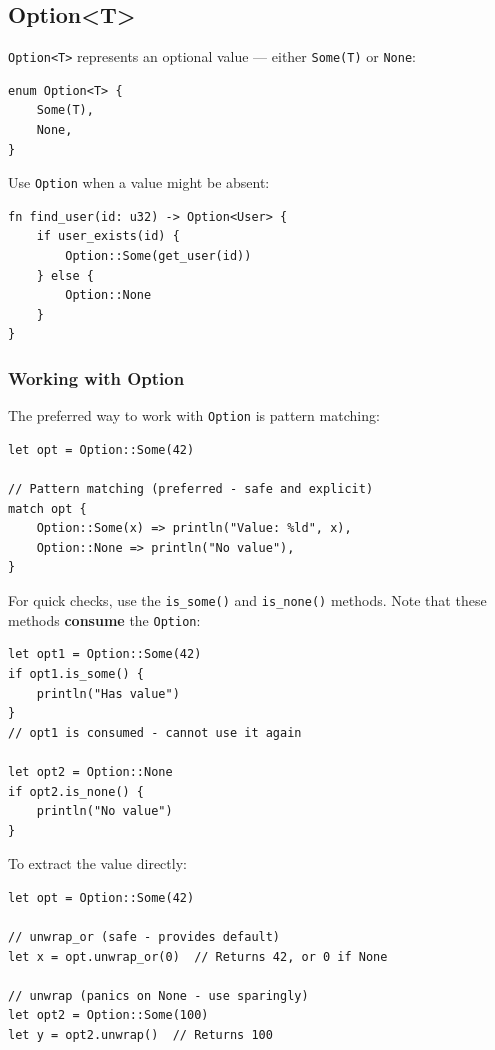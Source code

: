 \subsection{Option<T>}

\texttt{Option<T>} represents an optional value --- either \texttt{Some(T)} or \texttt{None}:

\begin{lstlisting}
enum Option<T> {
    Some(T),
    None,
}
\end{lstlisting}

Use \texttt{Option} when a value might be absent:

\begin{lstlisting}
fn find_user(id: u32) -> Option<User> {
    if user_exists(id) {
        Option::Some(get_user(id))
    } else {
        Option::None
    }
}
\end{lstlisting}

\subsubsection{Working with Option}

The preferred way to work with \texttt{Option} is pattern matching:

\begin{lstlisting}
let opt = Option::Some(42)

// Pattern matching (preferred - safe and explicit)
match opt {
    Option::Some(x) => println("Value: %ld", x),
    Option::None => println("No value"),
}
\end{lstlisting}

For quick checks, use the \texttt{is\_some()} and \texttt{is\_none()} methods. Note that these methods \textbf{consume} the \texttt{Option}:

\begin{lstlisting}
let opt1 = Option::Some(42)
if opt1.is_some() {
    println("Has value")
}
// opt1 is consumed - cannot use it again

let opt2 = Option::None
if opt2.is_none() {
    println("No value")
}
\end{lstlisting}

To extract the value directly:

\begin{lstlisting}
let opt = Option::Some(42)

// unwrap_or (safe - provides default)
let x = opt.unwrap_or(0)  // Returns 42, or 0 if None

// unwrap (panics on None - use sparingly)
let opt2 = Option::Some(100)
let y = opt2.unwrap()  // Returns 100
\end{lstlisting}

